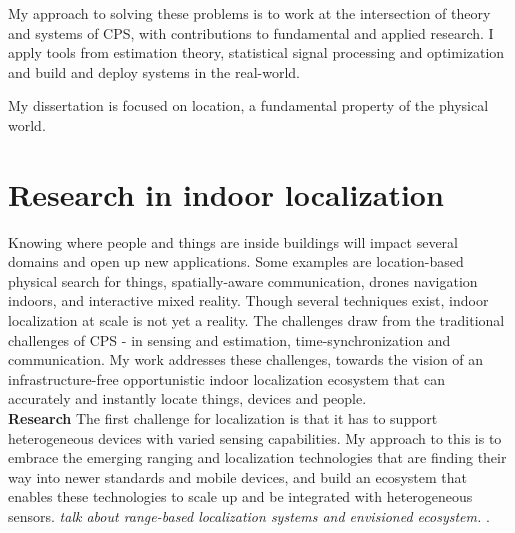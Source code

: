 \documentclass[10pt]{article}
\begin{document}
My approach to solving these problems is to work at the intersection of theory and systems of CPS, with contributions to fundamental and applied research. I apply tools from estimation theory, statistical signal processing and optimization and build and deploy systems in the real-world. 


My dissertation is focused on location, a fundamental property of the physical world. %
\section{Research in indoor localization}
Knowing where people and things are inside buildings will impact several domains and open up new applications. Some examples are location-based physical search for things, spatially-aware communication, drones navigation indoors, and interactive mixed reality. Though several techniques exist, indoor localization at scale is not yet a reality. The challenges draw from the traditional challenges of CPS - in sensing and estimation, time-synchronization and communication. My work addresses these challenges, towards the vision of an infrastructure-free opportunistic indoor localization ecosystem that can accurately and instantly locate things, devices and people.\\ %

\textbf{Research}
The first challenge for localization is that it has to support heterogeneous devices with varied sensing capabilities. My approach to this is to
 embrace the emerging ranging and localization technologies that are finding their way into newer standards and mobile devices, and build an ecosystem that enables these technologies to scale up and be integrated with heterogeneous sensors. \textit{talk about range-based localization systems and envisioned ecosystem. }.\\%
\end{document}
